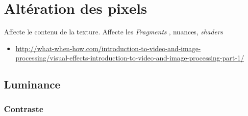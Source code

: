 \documentclass[
  french,
]{book}
\providecommand{\tightlist}{%
  \setlength{\itemsep}{0pt}\setlength{\parskip}{0pt}}
\begin{document}
\hypertarget{altuxe9ration-des-pixels}{%
\section{Altération des pixels}\label{altuxe9ration-des-pixels}}

Affecte le contenu de la texture.
Affecte les \emph{Fragments} , nuances, \emph{shaders}

\begin{itemize}
\tightlist
\item
  \url{http://what-when-how.com/introduction-to-video-and-image-processing/visual-effects-introduction-to-video-and-image-processing-part-1/}
\end{itemize}

\hypertarget{luminance}{%
\subsection{Luminance}\label{luminance}}

\hypertarget{contraste}{%
\subsubsection{Contraste}\label{contraste}}
\end{document}
